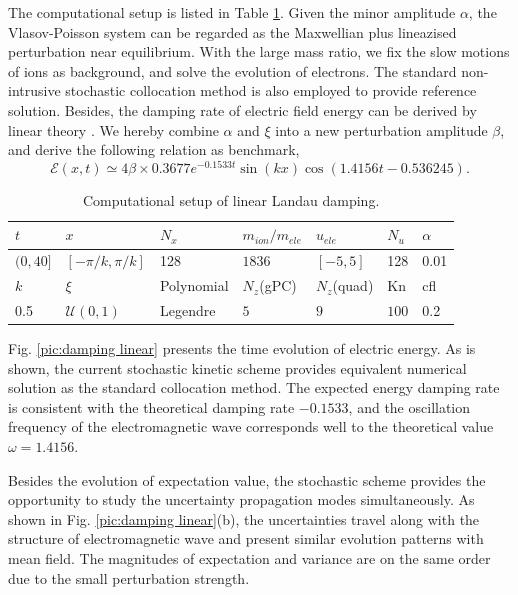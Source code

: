 \documentclass[preprint,3p,12pt,sort&compress]{elsarticle}
\begin{document}
The computational setup is listed in Table \ref{tab:linear damping}.
Given the minor amplitude $\alpha$, the Vlasov-Poisson system can be regarded as the Maxwellian plus lineazised perturbation near equilibrium.
With the large mass ratio, we fix the slow motions of ions as background, and solve the evolution of electrons.
The standard non-intrusive stochastic collocation method is also employed to provide reference solution.
Besides, the damping rate of electric field energy can be derived by linear theory \cite{crouseilles2009forward}.
We hereby combine $\alpha$ and $\xi$ into a new perturbation amplitude $\beta$, and derive the following relation as benchmark,
\begin{equation}
\mathcal E(x, t) \simeq 4 \beta \times 0.3677 e^{-0.1533 t} \sin (k x) \cos (1.4156 t-0.536245).
\label{eqn:damping theory}
\end{equation}
\begin{table}[htbp]
	\caption{Computational setup of linear Landau damping.} 
	\centering
	\begin{tabular}{lllllll} 
		\toprule 
		$t$ & $x$ & $N_x$ & $m_{ion}/m_{ele}$ & $u_{ele}$ & $N_u$ & $\alpha$ \\ 
		\midrule 
		$(0,40]$ & $[-\pi/k,\pi/k]$ & 128 & $1836$ & $[-5,5]$ & 128 & 0.01 \\ 
		\midrule 
		$k$ & $\xi$ & Polynomial & $N_z$(gPC) & $N_z$(quad) & Kn & cfl \\ 
		\midrule 
		0.5 & $\mathcal U(0,1)$ & Legendre & $5$ & $9$ & $100$  & 0.2   \\ 
		\bottomrule 
	\end{tabular} 
	\label{tab:linear damping}
\end{table}

Fig. \ref{pic:damping linear} presents the time evolution of electric energy.
As is shown, the current stochastic kinetic scheme provides equivalent numerical solution as the standard collocation method.
The expected energy damping rate is consistent with the theoretical damping rate $-0.1533$, and the oscillation frequency of the electromagnetic wave corresponds well to the theoretical value $\omega = 1.4156$.

Besides the evolution of expectation value, the stochastic scheme provides the opportunity to study the uncertainty propagation modes simultaneously.
As shown in Fig. \ref{pic:damping linear}(b), the uncertainties travel along with the structure of electromagnetic wave and present similar evolution patterns with mean field. 
The magnitudes of expectation and variance are on the same order due to the small perturbation strength.
\end{document}
